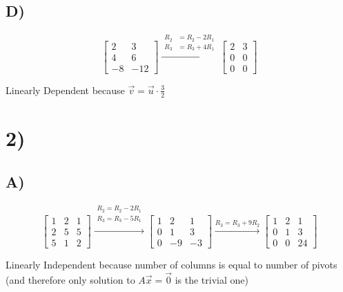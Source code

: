 \documentclass{article}
\begin{document}
\subsection*{D)}

\[
	\begin{bmatrix}
		2  & 3   \\
		4  & 6   \\
		-8 & -12
	\end{bmatrix}
	\xrightarrow{
		\begin{aligned}
			R_2 & = R_2 - 2R_1 \\
			R_3 & = R_3 + 4R_1
		\end{aligned}
	}
	\begin{bmatrix}
		2 & 3 \\
		0 & 0 \\
		0 & 0
	\end{bmatrix}
\]

Linearly Dependent because \(\vec{v} = \vec{u} \cdot \frac{3}{2}\)

\section*{2)}

\subsection*{A)}

\[
	\begin{bmatrix}
		1 & 2 & 1 \\
		2 & 5 & 5 \\
		5 & 1 & 2
	\end{bmatrix}
	\xrightarrow{
		\begin{aligned}
			R_2 = R_2 - 2R_1 \\
			R_3 = R_3 - 5R_1 \\
		\end{aligned}
	}
	\begin{bmatrix}
		1 & 2  & 1  \\
		0 & 1  & 3  \\
		0 & -9 & -3
	\end{bmatrix}
	\xrightarrow{R_3 = R_3 + 9R_2}
	\begin{bmatrix}
		1 & 2 & 1  \\
		0 & 1 & 3  \\
		0 & 0 & 24
	\end{bmatrix}
\]

Linearly Independent because number of columns is equal to number of pivots (and therefore only solution to \(A\vec{x}=\vec{0}\) is the trivial one)
\end{document}

